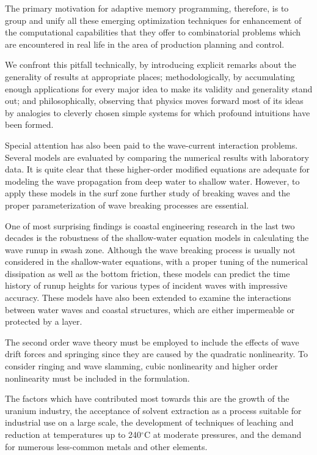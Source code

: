 \begin{preface}
The primary motivation for adaptive memory programming, therefore, is
to group and unify all these emerging optimization techniques for
enhancement of the computational capabilities that they offer to
combinatorial problems which are encountered in real life in the area
of production planning and control.

We confront this pitfall technically, by introducing explicit remarks
about the generality of results at appropriate places;
methodologically, by accumulating enough applications for every major
idea to make its validity and generality stand out; and
philosophically, observing that physics moves forward most of its
ideas by analogies to cleverly chosen simple systems for which
profound intuitions have been formed.

Special attention has also been paid to the wave-current interaction
problems. Several models are evaluated by comparing the numerical
results with laboratory data. It is quite clear that these
higher-order modified equations are adequate for modeling the wave
propagation from deep water to shallow water. However, to apply these
models in the surf zone further study of breaking waves and the proper
parameterization of wave breaking processes are essential.

One of most surprising findings is coastal engineering research in the
last two decades is the robustness of the shallow-water equation
models in calculating the wave runup in swash zone. Although the wave
breaking process is usually not considered in the shallow-water
equations, with a proper tuning of the numerical dissipation as well
as the bottom friction, these models can predict the time history of
runup heights for various types of incident waves with impressive
accuracy. These models have also been extended to examine the
interactions between water waves and coastal structures, which are
either impermeable or protected by a layer.

The second order wave theory must be employed to include the effects
of wave drift forces and springing since they are caused by the
quadratic nonlinearity. To consider ringing and wave slamming, cubic
nonlinearity and higher order nonlinearity must be included in the
formulation.

The factors which have contributed most towards this are the growth of
the uranium industry, the acceptance of solvent extraction as a
process suitable for industrial use on a large scale, the development
of techniques of leaching and reduction at temperatures up to
240$^\circ$C at moderate pressures, and the demand for numerous
less-common metals and other elements.


\end{preface}
